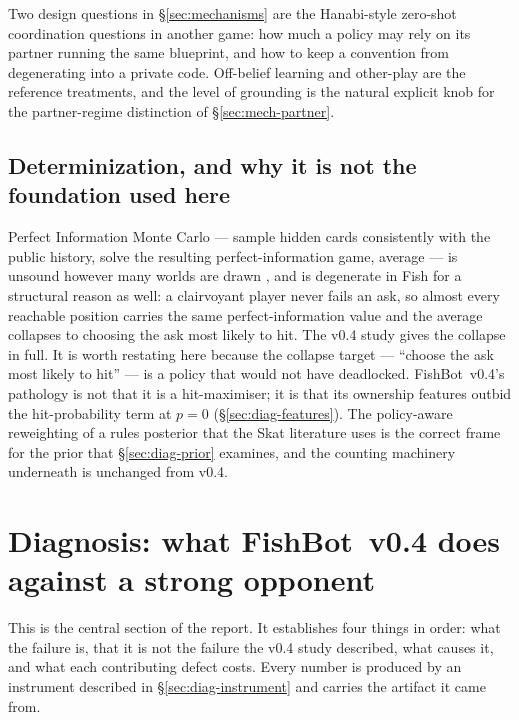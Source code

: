 \documentclass[11pt]{article}
\theoremstyle{definition}
\DeclareRobustCommand{\vfour}{\texorpdfstring{\mbox{FishBot v0.4}}{FishBot v0.4}}
\begin{document}
Two design questions in \S\ref{sec:mechanisms} are the Hanabi-style zero-shot
coordination questions \cite{bard-hanabi} in another game: how much a policy may
rely on its partner running the same blueprint, and how to keep a convention from
degenerating into a private code. Off-belief learning \cite{hu-obl} and
other-play \cite{hu-otherplay} are the reference treatments, and the level of
grounding is the natural explicit knob for the partner-regime distinction of
\S\ref{sec:mech-partner}.

\subsection{Determinization, and why it is not the foundation used here}

Perfect Information Monte Carlo --- sample hidden cards consistently with the
public history, solve the resulting perfect-information game, average
\cite{ginsberg-gib} --- is unsound however many worlds are drawn
\cite{frank-basin-ai}, and is degenerate in Fish for a structural reason as well:
a clairvoyant player never fails an ask, so almost every reachable position
carries the same perfect-information value and the average collapses to choosing
the ask most likely to hit. The v0.4 study gives the collapse in full. It is
worth restating here because the collapse target --- ``choose the ask most likely
to hit'' --- is a policy that would not have deadlocked. \vfour{}'s pathology is
not that it is a hit-maximiser; it is that its ownership features outbid the
hit-probability term at $p=0$ (\S\ref{sec:diag-features}). The policy-aware
reweighting of a rules posterior that the Skat literature uses
\cite{solinas-supervised,rebstock-inference,buro-kermit} is the correct frame for
the prior that \S\ref{sec:diag-prior} examines, and the counting machinery
underneath \cite{lsw,cryan-dyer} is unchanged from v0.4.
\section{Diagnosis: what \vfour{} does against a strong opponent}
\label{sec:diagnosis}

This is the central section of the report. It establishes four things in order:
what the failure is, that it is not the failure the v0.4 study described, what
causes it, and what each contributing defect costs. Every number is produced by
an instrument described in \S\ref{sec:diag-instrument} and carries the artifact
it came from.
\end{document}
